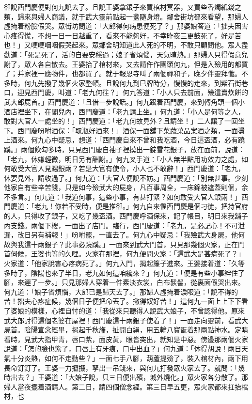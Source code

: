 \begin{showcontents}{}
卻說西門慶便對何九說去了。且說王婆拿銀子來買棺材冥器，又買些香燭紙錢之類，歸來與婦人商議，就于武大靈前點起一盞隨身燈。鄰舍街坊都來看望，那婦人虛掩着粉臉假哭。眾街坊問道：「大郎得何病患便死了？」那婆娘答道：「拙夫因害心疼得慌，不想一日一日越重了，看來不能夠好，不幸昨夜三更鼓死了，好是苦也！」又哽哽咽咽假哭起來。眾鄰舍明知道此人死的不明，不敢只顧問他。眾人盡勸道：「死是死了，活的自要安穩過；娘子省煩惱，天氣暄熱。」那婦人只得假意兒謝了，眾人各自散去。王婆抬了棺材來，又去請仵作團頭何九，但是入殮用的都買了；并家裡一應物件，也都買了。就于報恩寺叫了兩個禪和子，晚夕伴靈拜懺。不多時，何九先撥了幾個火家整頓。且說何九到巳牌時分，慢慢的走來，到紫石街巷口，迎見西門慶，叫道：「老九何往？」何九答道：「小人只去前面，殮這賣炊餅的武大郎屍首。」西門慶道：「且借一步說話。」何九跟着西門慶，來到轉角頭一個小酒店裡坐下，在閣兒內，西門慶道：「老九請上坐。」何九道：「小人是何等之人，敢對大官人一處坐的！」西門慶道：「老九何故見外？且請坐！」二人讓了一回坐下。西門慶吩咐酒保：「取瓶好酒來！」酒保一面舖下菜蔬菓品案酒之類，一面盪上酒來。何九心中疑忌，想道：「西門慶自來不曾和我吃酒，今日這盃酒，必有蹺蹊。」兩個飲勾多時，只見西門慶自袖子裡摸出一錠雪花銀子，放在面前，說道：「老九，休嫌輕微，明日另有酬謝。」何九叉手道：「小人無半點用功效力之處，如何敢受大官人見賜銀兩？若是大官有使令，小人也不敢辭！」西門慶道：「老九，休要見外，請收過了。」何九道：「大官人便說不妨。」西門慶道：「別無甚事。少刻他家自有些辛苦錢，只是如今殮武大的屍身，凡百事周全，一床錦被遮蓋則個，余不多言。」何九道：「我道何事，這些小事，有甚打緊？如何敢受大官人銀兩！」西門慶道：「老九！你若不受時，便是推卻。」何九自來懼西門慶是個刁徒，把持官府的人，只得收了銀子，又吃了幾盃酒。西門慶呼酒保來，記了帳目，明日來我舖子內支錢。兩個下樓，一面出了店門。臨行，西門慶道：「老九，是必記心！不可泄漏，改日另有補報！」吩咐罷，一直去了。何九心中疑忌：「我殮武大身屍，他何故與我這十兩銀子？此事必蹺蹊。」一面來到武大門首，只見那幾個火家，正在門首伺候，王婆也等的久哩。火家在那裡，何九便問火家：「這武大是甚病死了？」火家道：「他家說害心疼病死了。」何九入門，揭起簾子進來。王婆接着道：「久等多時了，陰陽也來了半日，老九如何這咱纔來？」何九道：「便是有些小事絆住了腳，來遲了一步。」只見那婦人穿着一件素淡衣裳，白布䯼髻，從裏面假哭出來。何九道：「娘子省煩惱，大郎已是歸天去了。」那婦人虛掩着淚眼道：「說不得的苦！拙夫心疼症候，幾個日子便把命丟了。撇得奴好苦！」這何九一面上上下下看了婆娘的模樣，心裡自忖的道：「我從來只聽得人說武大娘子，不曾認得他。原來武大郎討得這個老婆在屋裡！西門慶這十兩銀子使着了！」一面走向靈前，看武大屍首。陰陽宣念經畢，揭起千秋旛，扯開白絹，用五輪八寶翫着那兩點神水。定睛看時，見武大指甲青，唇口紫，面皮黃，眼皆突出，就知是中惡。傍邊那兩個火家說道：「怎的臉也紫了，口唇上有牙痕，口中出血？」何九道：「休得胡說！兩日天氣十分炎熱，如何不走動些？」一面七手八腳，葫蘆提殮了，裝入棺材內，兩下用長命釘釘了。王婆一力攛掇，拏出一吊錢來，與何九打發眾火家去了。就問：「幾時出去？」王婆道：「大娘子說，只三日便出殯，城外燒化。」眾火家各分散了。那婦人當夜擺着酒請人。第二日，請四個僧念經。第三日早五更，眾火家都來扛抬棺材，也
\end{showcontents}

